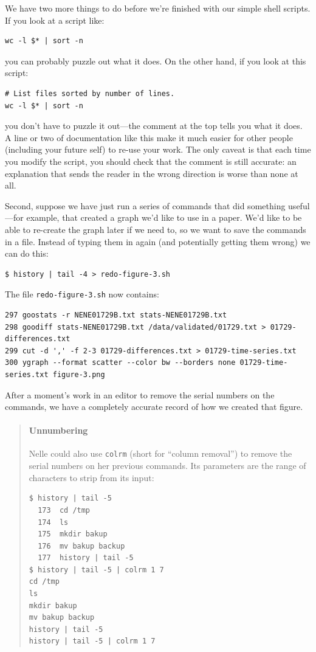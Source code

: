 \documentclass[]{book}
\begin{document}
We have two more things to do before we're finished with our simple
shell scripts. If you look at a script like:

\begin{verbatim}
wc -l $* | sort -n
\end{verbatim}

you can probably puzzle out what it does. On the other hand, if you look
at this script:

\begin{verbatim}
# List files sorted by number of lines.
wc -l $* | sort -n
\end{verbatim}

you don't have to puzzle it out---the comment at the top tells you what
it does. A line or two of documentation like this make it much easier
for other people (including your future self) to re-use your work. The
only caveat is that each time you modify the script, you should check
that the comment is still accurate: an explanation that sends the reader
in the wrong direction is worse than none at all.

Second, suppose we have just run a series of commands that did something
useful---for example, that created a graph we'd like to use in a paper.
We'd like to be able to re-create the graph later if we need to, so we
want to save the commands in a file. Instead of typing them in again
(and potentially getting them wrong) we can do this:

\begin{verbatim}
$ history | tail -4 > redo-figure-3.sh
\end{verbatim}

The file \texttt{redo-figure-3.sh} now contains:

\begin{verbatim}
297 goostats -r NENE01729B.txt stats-NENE01729B.txt
298 goodiff stats-NENE01729B.txt /data/validated/01729.txt > 01729-differences.txt
299 cut -d ',' -f 2-3 01729-differences.txt > 01729-time-series.txt
300 ygraph --format scatter --color bw --borders none 01729-time-series.txt figure-3.png
\end{verbatim}

After a moment's work in an editor to remove the serial numbers on the
commands, we have a completely accurate record of how we created that
figure.

\begin{quote}
\mbox{}\paragraph{Unnumbering}

Nelle could also use \texttt{colrm} (short for ``column removal'') to
remove the serial numbers on her previous commands. Its parameters are
the range of characters to strip from its input:

\begin{verbatim}
$ history | tail -5
  173  cd /tmp
  174  ls
  175  mkdir bakup
  176  mv bakup backup
  177  history | tail -5
$ history | tail -5 | colrm 1 7
cd /tmp
ls
mkdir bakup
mv bakup backup
history | tail -5
history | tail -5 | colrm 1 7
\end{verbatim}
\end{quote}
\end{document}
